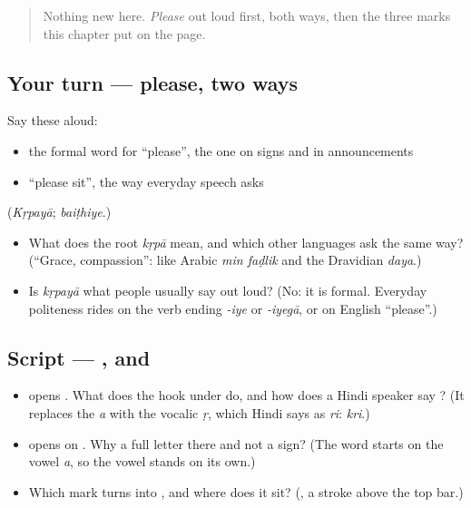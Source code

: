 \label{lesson:HI-C08-checkpoint}



\begin{quote}
Nothing new here. \emph{Please} out loud first, both ways, then the three marks this chapter put on the page.
\end{quote}

\subsection*{Your turn — please, two ways}
Say these aloud:

\begin{itemize}
\raggedright
  \item the formal word for \textquotedblleft{}please\textquotedblright{}, the one on signs and in announcements
  \item \textquotedblleft{}please sit\textquotedblright{}, the way everyday speech asks
\end{itemize}

(\emph{Kṛpayā}; \emph{baiṭhiye}.)

\begin{itemize}
\raggedright
  \item What does the root \emph{kṛpā} mean, and which other languages ask the same way? (\textquotedblleft{}Grace, compassion\textquotedblright{}: like Arabic \emph{min faḍlik} and the Dravidian \emph{daya}.)
  \item Is \emph{kṛpayā} what people usually say out loud? (No: it is formal. Everyday politeness rides on the verb ending \emph{-iye} or \emph{-iyegā}, or on English \textquotedblleft{}please\textquotedblright{}.)
\end{itemize}

\subsection*{Script — ,  and }
\begin{itemize}
\raggedright
  \item \textbf{} opens \textbf{}. What does the hook under \textbf{} do, and how does a Hindi speaker say \textbf{}? (It replaces the \emph{a} with the vocalic \emph{ṛ}, which Hindi says as \emph{ri}: \emph{kri}.)
  \item \textbf{} opens on \textbf{}. Why a full letter there and not a sign? (The word starts on the vowel \emph{a}, so the vowel stands on its own.)
  \item Which mark turns \textbf{} into \textbf{}, and where does it sit? (\textbf{}, a stroke above the top bar.)
\end{itemize}

